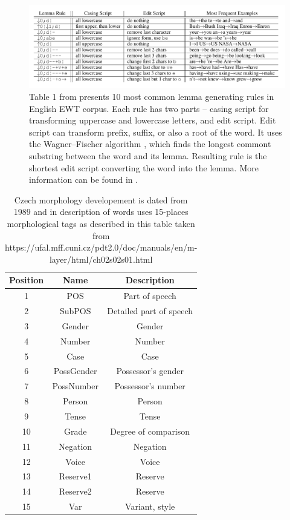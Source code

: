 \begin{figure}[H]
\centering
\includegraphics[width=1\textwidth]{../img/lemma_rules}
\protect\caption{
Table 1 from \citep{Straka2019b} presents 10 most common lemma generating rules in English EWT corpus. Each rule has two parts -- casing script for transforming uppercase and lowercase letters, and edit script. Edit script can transform prefix, suffix, or also a root of the word. It uses the Wagner–Fischer algorithm \citep{Wagner}, which finds the longest commont substring between the word and its lemma. Resulting rule is the shortest edit script converting the word into the lemma. More information can be found in \citep{Straka2019b}.
}
\label{fig:lemma_rules}
\end{figure}

\begin{table}
\centering
\label{Tab:tagset}
\begin{tabular}{ |c|c|c| } 

 \hline
 Position & Name & Description \\ 
 \hline \hline
 1 & POS & Part of speech \\ \hline
 2 & SubPOS & Detailed part of speech \\ \hline
  3 & Gender & Gender \\ \hline
4 & Number & Number \\\hline
  5 & Case & Case \\ \hline
 6 & PossGender & Possessor's gender \\\hline
  7 & PossNumber & Possessor's number \\ \hline
8 & Person & Person \\\hline
  9 & Tense & Tense \\ \hline
 10 & Grade & Degree of comparison\\\hline
  11 & Negation & Negation \\ \hline
 12 & Voice & Voice \\\hline
 13 & Reserve1 & Reserve \\ \hline
14 & Reserve2 & Reserve \\\hline
  15 & Var & Variant, style \\ 
 \hline

\end{tabular}
\caption{Czech morphology developement is dated from 1989 \citep{Hajic2004} %
and in description of words uses 15-places morphological tags as described in this table taken from https://ufal.mff.cuni.cz/pdt2.0/doc/manuals/en/m-layer/html/ch02s02s01.html}
\end{table}

